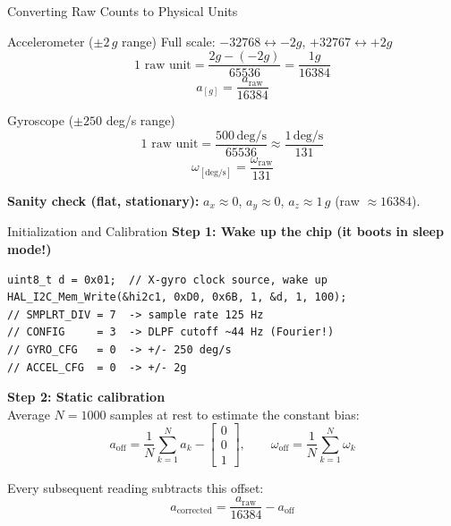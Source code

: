 \documentclass[10pt]{beamer}
\begin{document}
\begin{frame}{Converting Raw Counts to Physical Units}
  \begin{block}{Accelerometer ($\pm 2\,g$ range)}
    Full scale: $-32768 \leftrightarrow -2g$, $+32767 \leftrightarrow +2g$
    \[
      1 \text{ raw unit} = \frac{2g - (-2g)}{65536} = \frac{1g}{16384}
    \]
    \[
      \boxed{a_{[g]} = \frac{a_{\text{raw}}}{16384}}
    \]
  \end{block}

  \begin{block}{Gyroscope ($\pm 250$ deg/s range)}
    \[
      1 \text{ raw unit} = \frac{500\, \text{deg/s}}{65536} \approx \frac{1\, \text{deg/s}}{131}
    \]
    \[
      \boxed{\omega_{[\text{deg/s}]} = \frac{\omega_{\text{raw}}}{131}}
    \]
  \end{block}

  \scriptsize
  \textbf{Sanity check (flat, stationary):} $a_x \approx 0$, $a_y \approx 0$, $a_z \approx 1\,g$ (raw $\approx 16384$).
\end{frame}

\begin{frame}[fragile]{Initialization and Calibration}
  \textbf{Step 1: Wake up the chip (it boots in sleep mode!)}

\begin{lstlisting}
uint8_t d = 0x01;  // X-gyro clock source, wake up
HAL_I2C_Mem_Write(&hi2c1, 0xD0, 0x6B, 1, &d, 1, 100);
// SMPLRT_DIV = 7  -> sample rate 125 Hz
// CONFIG     = 3  -> DLPF cutoff ~44 Hz (Fourier!)
// GYRO_CFG   = 0  -> +/- 250 deg/s
// ACCEL_CFG  = 0  -> +/- 2g
\end{lstlisting}

  \textbf{Step 2: Static calibration}\\
  Average $N = 1000$ samples at rest to estimate the constant bias:
  \[
    a_{\text{off}} = \frac{1}{N}\sum_{k=1}^{N} a_k - \begin{bmatrix} 0\\0\\1 \end{bmatrix},
    \qquad
    \omega_{\text{off}} = \frac{1}{N}\sum_{k=1}^{N} \omega_k
  \]

  Every subsequent reading subtracts this offset:
  \[
    a_{\text{corrected}} = \frac{a_{\text{raw}}}{16384} - a_{\text{off}}
  \]
\end{frame}

\end{document}

